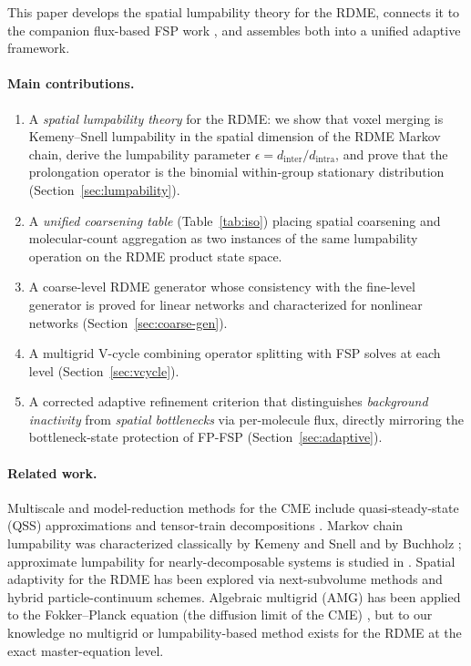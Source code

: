 \documentclass[review,onefignum,onetabnum]{siamart171218}
\begin{document}
This paper develops the spatial lumpability theory for the RDME,
connects it to the companion flux-based FSP work
\cite{Dhumuntarao2024}, and assembles both into a unified
adaptive framework.

\paragraph{Main contributions.}
\begin{enumerate}
  \item A \emph{spatial lumpability theory} for the RDME: we
    show that voxel merging is Kemeny--Snell lumpability in the
    spatial dimension of the RDME Markov chain, derive the
    lumpability parameter $\epsilon = d_{\mathrm{inter}} /
    d_{\mathrm{intra}}$, and prove that the prolongation
    operator is the binomial within-group stationary distribution
    (Section~\ref{sec:lumpability}).
  \item A \emph{unified coarsening table} (Table~\ref{tab:iso})
    placing spatial coarsening and molecular-count aggregation as
    two instances of the same lumpability operation on the RDME
    product state space.
  \item A coarse-level RDME generator whose consistency with the
    fine-level generator is proved for linear networks and
    characterized for nonlinear networks
    (Section~\ref{sec:coarse-gen}).
  \item A multigrid V-cycle combining operator splitting with
    FSP solves at each level (Section~\ref{sec:vcycle}).
  \item A corrected adaptive refinement criterion that
    distinguishes \emph{background inactivity} from
    \emph{spatial bottlenecks} via per-molecule flux, directly
    mirroring the bottleneck-state protection of FP-FSP
    (Section~\ref{sec:adaptive}).
\end{enumerate}

\paragraph{Related work.}
Multiscale and model-reduction methods for the CME include
quasi-steady-state (QSS) approximations
\cite{peles,CAO20083472,Cao2016} and tensor-train decompositions
\cite{Kazeev2014}.  Markov chain lumpability was characterized
classically by Kemeny and Snell \cite{kemeny_snell_1960} and by
Buchholz \cite{Buchholz1994}; approximate lumpability for
nearly-decomposable systems is studied in \cite{Simon1961}.
Spatial adaptivity for the RDME has been explored via
next-subvolume methods \cite{Elf2004} and hybrid
particle-continuum schemes.  Algebraic multigrid (AMG) has been
applied to the Fokker--Planck equation (the diffusion limit of
the CME) \cite{Dolgov2012}, but to our knowledge no multigrid or
lumpability-based method exists for the RDME at the exact
master-equation level.
\end{document}
